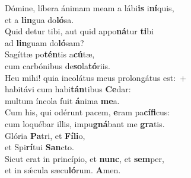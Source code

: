 \evenverse Dómine, líbera ánimam meam a lábi\textbf{is} i\textbf{ní}quis,~\*\\
\evenverse et a \textbf{lin}gua do\textbf{ló}sa.\\
\oddverse Quid detur tibi, aut quid appo\textbf{ná}tur \textbf{ti}bi~\*\\
\oddverse ad \textbf{lin}guam do\textbf{ló}sam?\\
\evenverse Sagíttæ po\textbf{tén}tis a\textbf{cú}tæ,~\*\\
\evenverse cum carbónibus de\textbf{so}la\textbf{tó}riis.\\
\oddverse Heu mihi! quia incolátus meus prolongátus est:~+\\
\oddverse  habitávi cum habi\textbf{tán}tibus \textbf{Ce}dar:~\*\\
\oddverse multum íncola fuit \textbf{á}nima \textbf{me}a.\\
\evenverse Cum his, qui odérunt pacem, \textbf{e}ram pa\textbf{cí}\textbf{fi}cus:~\*\\
\evenverse cum loquébar illis, impu\textbf{gná}bant me \textbf{gra}tis.\\
\oddverse Glória \textbf{Pa}tri, et \textbf{Fí}\textbf{li}o,~\*\\
\oddverse et Spi\textbf{rí}tui \textbf{San}cto.\\
\evenverse Sicut erat in princípio, et \textbf{nunc}, et \textbf{sem}per,~\*\\
\evenverse et in sǽcula sæcu\textbf{ló}rum. \textbf{A}men.\\
